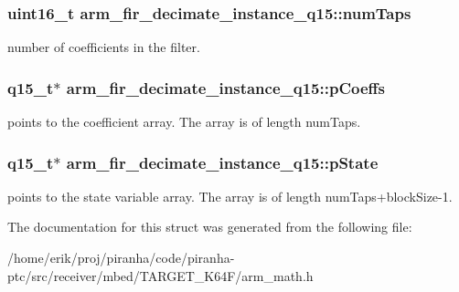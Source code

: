 \subsubsection[{\texorpdfstring{num\+Taps}{numTaps}}]{\setlength{\rightskip}{0pt plus 5cm}uint16\+\_\+t arm\+\_\+fir\+\_\+decimate\+\_\+instance\+\_\+q15\+::num\+Taps}\hypertarget{structarm__fir__decimate__instance__q15_ac1e9844488ec717da334fbd4c4f41990}{}\label{structarm__fir__decimate__instance__q15_ac1e9844488ec717da334fbd4c4f41990}
number of coefficients in the filter. 
\subsubsection[{\texorpdfstring{p\+Coeffs}{pCoeffs}}]{\setlength{\rightskip}{0pt plus 5cm}q15\+\_\+t$\ast$ arm\+\_\+fir\+\_\+decimate\+\_\+instance\+\_\+q15\+::p\+Coeffs}\hypertarget{structarm__fir__decimate__instance__q15_a01cacab67e73945e8289075598ede14d}{}\label{structarm__fir__decimate__instance__q15_a01cacab67e73945e8289075598ede14d}
points to the coefficient array. The array is of length num\+Taps. 
\subsubsection[{\texorpdfstring{p\+State}{pState}}]{\setlength{\rightskip}{0pt plus 5cm}q15\+\_\+t$\ast$ arm\+\_\+fir\+\_\+decimate\+\_\+instance\+\_\+q15\+::p\+State}\hypertarget{structarm__fir__decimate__instance__q15_a3f7b5184bb28853ef401b001df121047}{}\label{structarm__fir__decimate__instance__q15_a3f7b5184bb28853ef401b001df121047}
points to the state variable array. The array is of length num\+Taps+block\+Size-\/1. 

The documentation for this struct was generated from the following file\+:\begin{DoxyCompactItemize}
\item 
/home/erik/proj/piranha/code/piranha-\/ptc/src/receiver/mbed/\+T\+A\+R\+G\+E\+T\+\_\+\+K64\+F/arm\+\_\+math.\+h\end{DoxyCompactItemize}
